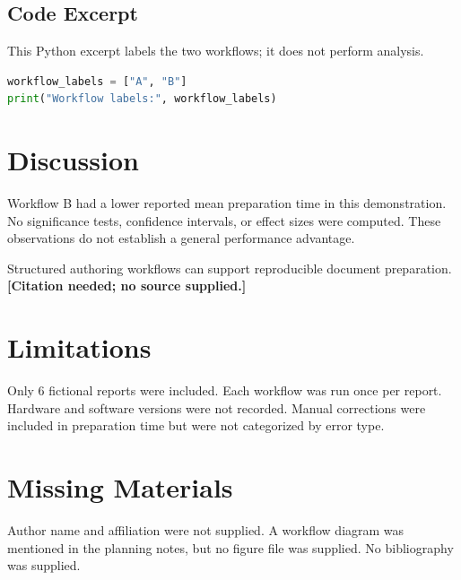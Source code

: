 \documentclass[11pt]{article}
\begin{document}
\subsection{Code Excerpt}
This Python excerpt labels the two workflows; it does not perform analysis.
\begin{lstlisting}[language=Python,breaklines=true,basicstyle=\ttfamily\small]
workflow_labels = ["A", "B"]
print("Workflow labels:", workflow_labels)
\end{lstlisting}

\section{Discussion}
Workflow B had a lower reported mean preparation time in this demonstration.
No significance tests, confidence intervals, or effect sizes were computed.
These observations do not establish a general performance advantage.

Structured authoring workflows can support reproducible document preparation.
\textbf{[Citation needed; no source supplied.]}

\section{Limitations}
Only 6 fictional reports were included. Each workflow was run once per
report. Hardware and software versions were not recorded. Manual
corrections were included in preparation time but were not categorized
by error type.

\section{Missing Materials}
Author name and affiliation were not supplied. A workflow diagram was
mentioned in the planning notes, but no figure file was supplied. No
bibliography was supplied.
\end{document}
